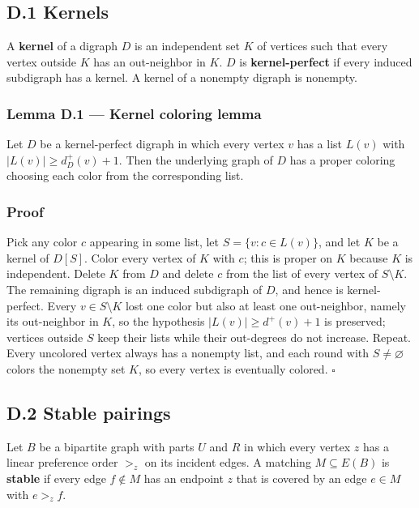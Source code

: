 \documentclass[
  american,
  11pt,
  a4paper,
]{article}
\newcounter{none} %
\begin{document}
\subsection{D.1 Kernels}\label{d.1-kernels}

A \textbf{kernel} of a digraph \(D\) is an independent set \(K\) of vertices such that every vertex outside \(K\) has an out-neighbor in \(K\). \(D\) is \textbf{kernel-perfect} if every induced subdigraph has a kernel. A kernel of a nonempty digraph is nonempty.

\subsubsection{Lemma D.1 --- Kernel coloring lemma}\label{lemma-d.1-kernel-coloring-lemma}

Let \(D\) be a kernel-perfect digraph in which every vertex \(v\) has a list \(L(v)\) with \(|L(v)|\ge d^+_D(v)+1\). Then the underlying graph of \(D\) has a proper coloring choosing each color from the corresponding list.

\subsubsection{Proof}\label{proof-9}

Pick any color \(c\) appearing in some list, let \(S=\{v:c\in L(v)\}\), and let \(K\) be a kernel of \(D[S]\). Color every vertex of \(K\) with \(c\); this is proper on \(K\) because \(K\) is independent. Delete \(K\) from \(D\) and delete \(c\) from the list of every vertex of \(S\setminus K\). The remaining digraph is an induced subdigraph of \(D\), and hence is kernel-perfect. Every \(v\in S\setminus K\) lost one color but also at least one out-neighbor, namely its out-neighbor in \(K\), so the hypothesis \(|L(v)|\ge d^+(v)+1\) is preserved; vertices outside \(S\) keep their lists while their out-degrees do not increase. Repeat. Every uncolored vertex always has a nonempty list, and each round with \(S\ne\varnothing\) colors the nonempty set \(K\), so every vertex is eventually colored. \(\square\)

\subsection{D.2 Stable pairings}\label{d.2-stable-pairings}

Let \(B\) be a bipartite graph with parts \(U\) and \(R\) in which every vertex \(z\) has a linear preference order \(>_z\) on its incident edges. A matching \(M\subseteq E(B)\) is \textbf{stable} if every edge \(f\notin M\) has an endpoint \(z\) that is covered by an edge \(e\in M\) with \(e>_zf\).
\end{document}
